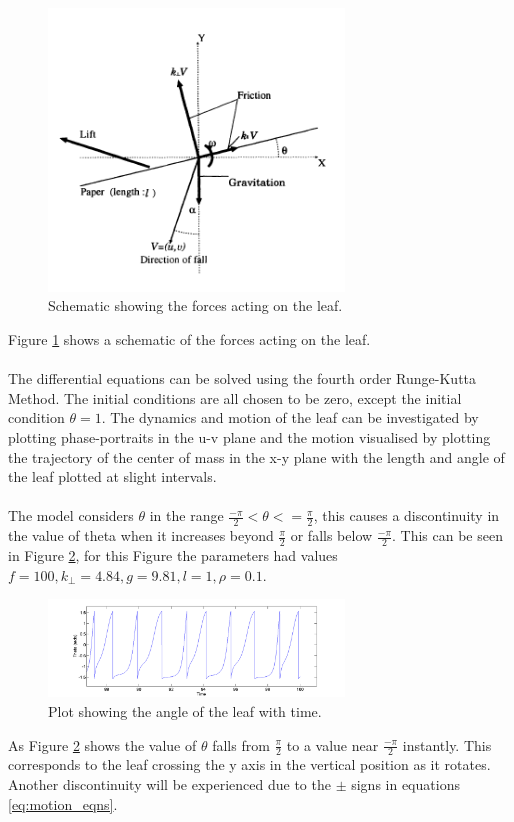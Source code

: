 \begin{figure}[H]
\centering
\includegraphics[width=0.7\textwidth]{FBD.png}
\caption{\label{fig:Leaf_diagram}Schematic showing the forces acting on the leaf.\cite{tanabe1994behavior}
}
\end{figure}
\noindent Figure \ref{fig:Leaf_diagram} shows a schematic of the forces acting on the leaf.
\\
\\
The differential equations can be solved using the fourth order Runge-Kutta Method. The initial conditions are all chosen to be zero, except the initial condition $\theta = 1$. The dynamics and motion of the leaf can be investigated by plotting phase-portraits in the u-v plane and the motion visualised by plotting the trajectory of the center of mass in the x-y plane with the length and angle of the leaf plotted at slight intervals.
\\
\\
\noindent The model considers $\theta$ in the range $\frac{-\pi}{2}<\theta<=\frac{\pi}{2}$, this causes a discontinuity in the value of theta when it increases beyond $\frac{\pi}{2}$ or falls below $\frac{-\pi}{2}$. This can be seen in Figure \ref{fig:Theta}, for this Figure the parameters had values $f=100,k_{\perp}=4.84,g=9.81,l=1,\rho=0.1$.

\begin{figure}[H]
\centering
\includegraphics[width=0.7\textwidth]{Theta_discon.png}
\caption{\label{fig:Theta}Plot showing the angle of the leaf with time.
}
\end{figure}
\noindent As Figure \ref{fig:Theta} shows the value of $\theta$ falls from $\frac{\pi}{2}$ to a value near $\frac{-\pi}{2}$ instantly. This corresponds to the leaf crossing the y axis in the vertical position as it rotates. Another discontinuity will be experienced due to the $\pm$ signs in equations \ref{eq:motion_eqns}.





